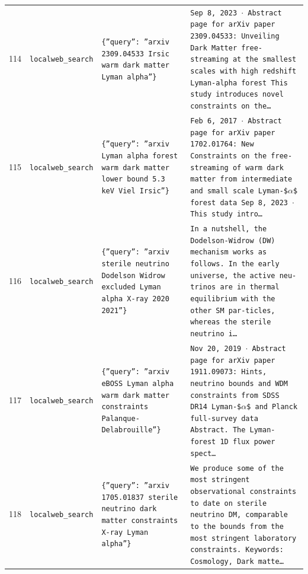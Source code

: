 \documentclass[11pt,a4paper]{article}
\begin{document}
\begin{longtable}{@{}p{}p{}p{}p{}@{}}
114 & \texttt{local}\newline\texttt{web\_\allowbreak{}search} & \texttt{\{''query'':\allowbreak{} ''arxiv 2309.04533 Irsic warm dark matter Lyman alpha''\}\allowbreak{}} & \texttt{Sep 8,\allowbreak{} 2023 $\cdot$ Abstract page for arXiv paper 2309.04533:\allowbreak{} Unveiling Dark Matter free-streaming at the smallest scales with high redshift Lyman-alpha forest This study introduces novel constraints on the\ldots{}\allowbreak{}} \\
115 & \texttt{local}\newline\texttt{web\_\allowbreak{}search} & \texttt{\{''query'':\allowbreak{} ''arxiv Lyman alpha forest warm dark matter lower bound 5.3 keV Viel Irsic''\}\allowbreak{}} & \texttt{Feb 6,\allowbreak{} 2017 $\cdot$ Abstract page for arXiv paper 1702.01764:\allowbreak{} New Constraints on the free-streaming of warm dark matter from intermediate and small scale Lyman-\$$\alpha$\$ forest data Sep 8,\allowbreak{} 2023 $\cdot$ This study intro\ldots{}\allowbreak{}} \\
116 & \texttt{local}\newline\texttt{web\_\allowbreak{}search} & \texttt{\{''query'':\allowbreak{} ''arxiv sterile neutrino Dodelson Widrow excluded Lyman alpha X-ray 2020 2021''\}\allowbreak{}} & \texttt{In a nutshell,\allowbreak{} the Dodelson-Widrow (DW)\allowbreak{} mechanism works as follows. In the early universe,\allowbreak{} the active neu-trinos are in thermal equilibrium with the other SM par-ticles,\allowbreak{} whereas the sterile neutrino i\ldots{}\allowbreak{}} \\
117 & \texttt{local}\newline\texttt{web\_\allowbreak{}search} & \texttt{\{''query'':\allowbreak{} ''arxiv eBOSS Lyman alpha warm dark matter constraints Palanque-Delabrouille''\}\allowbreak{}} & \texttt{Nov 20,\allowbreak{} 2019 $\cdot$ Abstract page for arXiv paper 1911.09073:\allowbreak{} Hints,\allowbreak{} neutrino bounds and WDM constraints from SDSS DR14 Lyman-\$$\alpha$\$ and Planck full-survey data Abstract. The Lyman- forest 1D flux power spect\ldots{}\allowbreak{}} \\
118 & \texttt{local}\newline\texttt{web\_\allowbreak{}search} & \texttt{\{''query'':\allowbreak{} ''arxiv 1705.01837 sterile neutrino dark matter constraints X-ray Lyman alpha''\}\allowbreak{}} & \texttt{We produce some of the most stringent observational constraints to date on sterile neutrino DM,\allowbreak{} comparable to the bounds from the most stringent laboratory constraints. Keywords:\allowbreak{} Cosmology,\allowbreak{} Dark matte\ldots{}\allowbreak{}} \\

\end{longtable}
\end{document}

